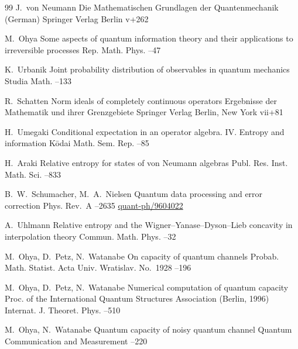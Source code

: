 \begin{thebibliography}{99}
\by J.~von Neumann
\book Die Mathematischen Grundlagen der  Quantenmechanik (German) 
\publ Springer Verlag
\publaddr Berlin
\totalpages v+262


\by M.~Ohya
\paper Some aspects of quantum information theory and their applications to irreversible processes
\jour Rep. Math. Phys.
--47


\by K.~Urbanik
\paper Joint probability distribution of observables in quantum mechanics
\jour Studia Math.
--133


\by R.~Schatten
\book  Norm ideals of completely continuous operators
\serial Ergebnisse der Mathematik und ihrer Grenzgebiete
\publ Springer Verlag
\publaddr Berlin, New York
\totalpages vii+81


\by H.~Umegaki
\paper Conditional expectation in an operator algebra. IV. Entropy and information
\jour K\={o}dai Math. Sem. Rep.
--85 


\by H.~Araki
\paper Relative entropy for states of von Neumann algebras
\jour Publ. Res. Inst. Math. Sci. 
--833


\by B.~W.~Schumacher, M.~A.~Nielsen
\paper Quantum data processing and error correction
\jour Phys. Rev.~A
–2635
\arxiv \href{http://arxiv.org/abs/quant-ph/9604022}{quant-ph/9604022}

\by A.~Uhlmann
\paper Relative entropy and the Wigner--Yanase--Dyson--Lieb concavity in interpolation theory
\jour Commun. Math. Phys.
--32


\by M.~Ohya, D.~Petz, N.~Watanabe
\paper On capacity of quantum channels
\jour Probab. Math. Statist. 
\issueinfo Acta Univ. Wratislav. No.~1928
--196 




\by M.~Ohya, D.~Petz, N.~Watanabe
\paper Numerical computation of quantum capacity
\paperinfo Proc. of the International Quantum Structures Association (Berlin, 1996)
\jour Internat. J. Theoret. Phys.
--510 

 



\by M.~Ohya, N.~Watanabe
\paper Quantum capacity of noisy quantum channel
\jour Quantum Communication and Measurement
--220 


\end{thebibliography}
